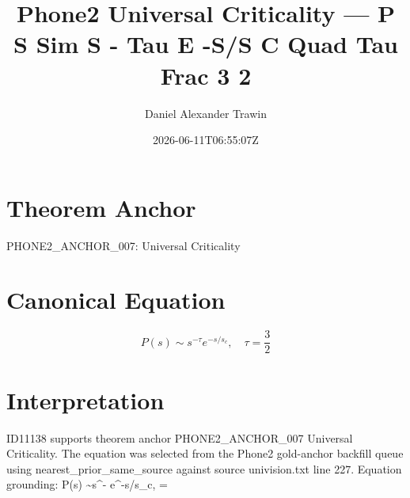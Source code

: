 \documentclass[11pt]{article}
\title{Phone2 Universal Criticality — P S Sim S - Tau E -S/S C Quad Tau Frac 3 2}
\author{Daniel Alexander Trawin}
\date{2026-06-11T06:55:07Z}
\begin{document}
\maketitle
\section*{Theorem Anchor}
PHONE2_ANCHOR_007: Universal Criticality
\section*{Canonical Equation}
\[
P(s) \sim s^{-\tau} e^{-s/s_c}, \quad \tau = \frac{3}{2}
\]
\section*{Interpretation}
ID11138 supports theorem anchor PHONE2_ANCHOR_007 Universal Criticality. The equation was selected from the Phone2 gold-anchor backfill queue using nearest_prior_same_source against source univision.txt line 227. Equation grounding: P(s) \sim s^{-\tau} e^{-s/s_c}, \quad \tau = 
\end{document}
